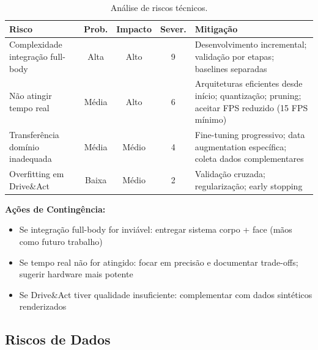 \documentclass[12pt, a4paper]{article}
\begin{document}
\begin{table}[H]
    \centering
    \caption{Análise de riscos técnicos.}
    \small
    \begin{tabular}{|p{3cm}|c|c|c|p{4cm}|}
        \hline
        \textbf{Risco} & \textbf{Prob.} & \textbf{Impacto} & \textbf{Sever.} & \textbf{Mitigação} \\ \hline
        
        Complexidade integração full-body & 
        Alta & 
        Alto & 
        9 & 
        Desenvolvimento incremental; validação por etapas; baselines separadas \\ \hline
        
        Não atingir tempo real & 
        Média & 
        Alto & 
        6 & 
        Arquiteturas eficientes desde início; quantização; pruning; aceitar FPS reduzido (15 FPS mínimo) \\ \hline
        
        Transferência domínio inadequada & 
        Média & 
        Médio & 
        4 & 
        Fine-tuning progressivo; data augmentation específica; coleta dados complementares \\ \hline
        
        Overfitting em Drive\&Act & 
        Baixa & 
        Médio & 
        2 & 
        Validação cruzada; regularização; early stopping \\ \hline
        
    \end{tabular}
\end{table}

\textbf{Ações de Contingência:}
\begin{itemize}
    \item Se integração full-body for inviável: entregar sistema corpo + face (mãos como futuro trabalho)
    \item Se tempo real não for atingido: focar em precisão e documentar trade-offs; sugerir hardware mais potente
    \item Se Drive\&Act tiver qualidade insuficiente: complementar com dados sintéticos renderizados
\end{itemize}

\subsection{Riscos de Dados}
\end{document}
